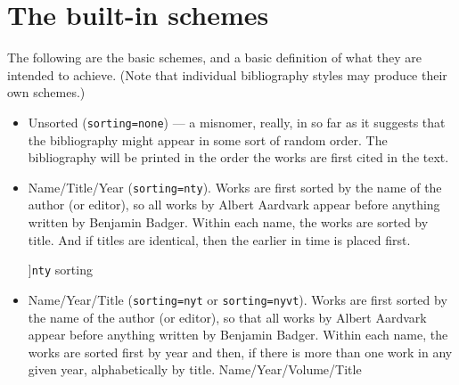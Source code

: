 \section{The built-in schemes}

The following are the basic schemes, and a basic definition of what they
are intended to achieve. (Note that individual bibliography styles may
produce their own schemes.)

\begin{itemize}
\item
  Unsorted (\texttt{sorting=none}) --- a misnomer, really, in so far as
  it suggests that the bibliography might appear in some sort of random
  order. The bibliography will be printed in the order the works are
  first cited in the text.
\item
  Name/Title/Year (\texttt{sorting=nty}). Works are first sorted by the
  name of the author (or editor), so all works by Albert Aardvark appear
  before anything written by Benjamin Badger. Within each name, the
  works are sorted by title. And if titles are identical, then the
  earlier in time is placed first.
  \begin{marginfigure}[-20ex]
  \vspace{3pt}
  \caption[][]{\texttt{nty} sorting}
  \end{marginfigure}
\item Name/Year/Title (\texttt{sorting=nyt} or \texttt{sorting=nyvt}).
  Works are first sorted by the name of the author (or editor), so
  that all works by Albert Aardvark appear before anything written by
  Benjamin Badger. Within each name, the works are sorted first by
  year and then, if there is more than one work in any given year,
  alphabetically by title. Name/Year/Volume/Title

\end{itemize}
